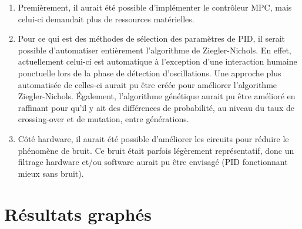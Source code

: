 \documentclass[a4paper,10pt]{report}
\begin{document}
\begin{enumerate}
\item Premièrement, il aurait été possible d'implémenter le contrôleur MPC, mais celui-ci demandait plus de ressources matérielles.
\item Pour ce qui est des méthodes de sélection des paramètres de PID, il serait possible d'automatiser entièrement l'algorithme de Ziegler-Nichols. En effet, actuellement celui-ci est automatique à l'exception d'une interaction humaine ponctuelle lors de la phase de détection d'oscillations. Une approche plus automatisée de celles-ci aurait pu être créée pour améliorer l'algorithme Ziegler-Nichols. Également, l'algorithme génétique aurait pu être amélioré en raffinant pour qu'il y ait des différences de probabilité, au niveau du taux de crossing-over et de mutation, entre générations.
\item Côté hardware, il aurait été possible d'améliorer les circuits pour réduire le phénomène de bruit. Ce bruit était parfois légèrement représentatif, donc un filtrage hardware et/ou software aurait pu être envisagé (PID fonctionnant mieux sans bruit).
\end{enumerate}







\appendix

\chapter{Résultats graphés}
\end{document}
